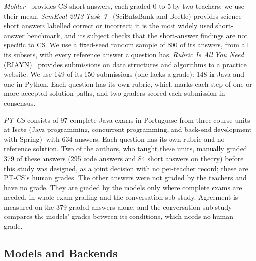 \emph{Mohler}~\cite{mohler_text_2009,mohler_learning_2011} provides CS short answers, each graded 0 to 5
by two teachers; we use their mean. \emph{SemEval-2013 Task~7}~\cite{dzikovska_semeval_2013}
(SciEntsBank and Beetle) provides science short answers labelled correct or incorrect; it is the most widely
used short-answer benchmark, and its subject checks that the short-answer findings are not specific to CS. We
use a fixed-seed random sample of 800 of its answers, from all its subsets, with every reference answer a
question has.
\emph{Rubric Is All You Need} (RIAYN)~\cite{pathak_rubric_2025} provides submissions on data structures and
algorithms to a practice website. We use 149 of its 150 submissions (one lacks a grade): 148 in Java and one in
Python. Each question has its own rubric, which marks each step of one or more accepted solution paths, and two
graders scored each submission in consensus.

\emph{PT-CS} consists of 97 complete Java exams in Portuguese from three course units at Iscte (Java programming, concurrent programming,
and back-end development with Spring), with 634 answers.
Each question has its own rubric and no reference solution. Two of the authors, who taught these units,
manually graded 379 of these answers (295 code answers and 84 short answers on theory) before this study was
designed, as a joint decision with no per-teacher record; these are PT-CS's human grades. The other answers were
not graded by the teachers and have no grade. They are graded by the models only where complete exams are needed,
in whole-exam grading and the conversation sub-study. Agreement is measured on the 379 graded answers alone, and
the conversation sub-study compares the models' grades between its conditions, which needs no human grade.

\subsection{Models and Backends}
\label{sec:models}

